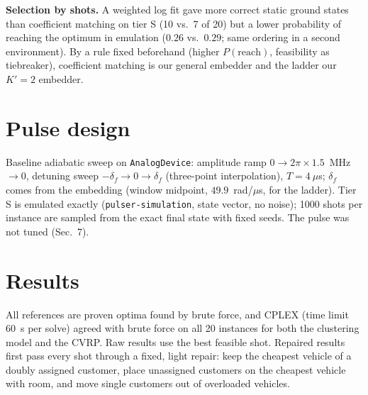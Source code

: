 \documentclass[10pt]{article}
\begin{document}
\textbf{Selection by shots.} A weighted log fit gave more correct static ground states than coefficient matching on
tier S (10 vs.\ 7 of 20) but a lower probability of reaching the optimum in emulation ($0.26$ vs.\ $0.29$; same
ordering in a second environment). By a rule fixed beforehand (higher $P(\text{reach})$, feasibility as tiebreaker),
coefficient matching is our general embedder and the ladder our $K'=2$ embedder.

\section{Pulse design}
Baseline adiabatic sweep on \texttt{AnalogDevice}: amplitude ramp $0\to2\pi\times1.5$~MHz$\to0$, detuning sweep
$-\delta_f\to0\to\delta_f$ (three-point interpolation), $T=4~\mu$s; $\delta_f$ comes from the embedding (window midpoint,
$49.9$~rad/$\mu$s, for the ladder). Tier S is emulated exactly (\texttt{pulser-simulation}, state vector, no noise);
1000 shots per instance are sampled from the exact final state with fixed seeds. The pulse was not tuned (Sec.~7).

\section{Results}
All references are proven optima found by brute force, and CPLEX (time limit 60~s per solve) agreed with brute force
on all 20 instances for both the clustering model and the CVRP. Raw results use the best feasible shot. Repaired
results first pass every shot through a fixed, light repair: keep the cheapest vehicle of a doubly assigned customer,
place unassigned customers on the cheapest vehicle with room, and move single customers out of overloaded vehicles.
\begin{table}[h]\centering\small
{}
\end{table}
\end{document}
